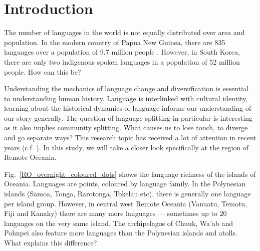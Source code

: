 \documentclass[unnumsec,webpdf,modern,medium]{oup-authoring-template}
\begin{document}



\maketitle

\newpage



\onecolumn
\section{Introduction}
\doublespacing

The number of languages in the world is not equally distributed over area and population. In the modern country of Papua New Guinea, there are 835 languages over a population of 9.7 million people \citep{UN_pop, glottolog3}. However, in South Korea, there are only two indigenous spoken languages in a population of 52 million people. How can this be?

Understanding the mechanics of language change and diversification is essential to understanding human history. Language is interlinked with cultural identity, learning about the historical dynamics of language informs our understanding of our story generally. The question of language splitting in particular is interesting as it also implies community splitting. What causes us to lose touch, to diverge and go separate ways? This research topic has received a lot of attention in recent years (c.f. \citet{gavin2017process,  greenhill2015demographic, Pacheco_Coelho_2019, hua2019ecological}). In this study, we will take a closer look specifically at the region of Remote Oceania. 

Fig.~\ref{RO_overnight_coloured_dots} shows the language richness of the islands of Oceania. Languages are points, coloured by language family. In the Polynesian islands (S\={a}moa, Tonga, Rarotonga, Tokelau etc), there is generally one language per island group. However, in central west Remote Oceania (Vanuatu, Temotu, Fiji and Kanaky) there are many more languages --- sometimes up to 20 languages on the very same island. The archipelagos of Chuuk, Wa'ab and Pohnpei also feature more languages than the Polynesian islands and atolls. What explains this difference?
\end{document}
